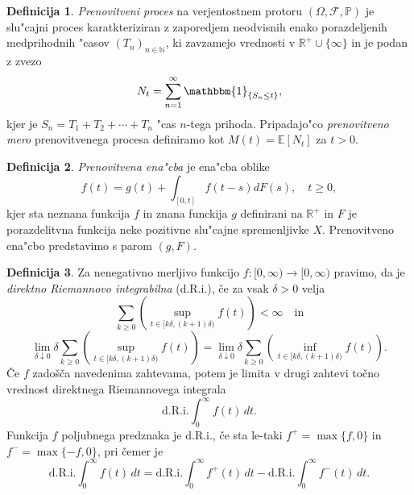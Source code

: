 \documentclass[12pt, a4paper, reqno]{amsart}
\theoremstyle{definition}
\newtheorem{definicija}{Definicija}[section]
\theoremstyle{plain}
\newcommand{\R}{\mathbb{R}}
\newcommand{\N}{\mathbb{N}}
\newcommand{\E}{\mathbb{E}}
\newcommand{\Prob}{\mathbb{P}}
\newcommand{\1}{\mathds{1}}
\begin{document}
    \begin{definicija}
        \textit{Prenovitveni proces} na verjentostnem protoru $(\Omega, \mathcal{F}, \Prob)$ je slu"cajni 
        proces
        karatkteriziran z zaporedjem neodvisnih enako porazdeljenih medprihodnih "casov $(T_n)_{n\in\N}$, 
        ki zavzamejo vrednosti v $\R^+\cup\{\infty\}$ in je podan z zvezo 
        \begin{equation*}
            N_t = \sum_{n=1}^{\infty}\mathbbm{1}_{\{S_n\leq t\}},
        \end{equation*}
        kjer je $S_n = T_1 + T_2 + \cdots + T_n$ "cas $n$-tega prihoda. Pripadajo"co 
        \textit{prenovitveno mero} prenovitvenega procesa definiramo kot $M(t) = \E\left[N_t\right]$ za 
        $t > 0$.
        \label{def:PrenovitveniProces}
    \end{definicija}

    \begin{definicija}
        \textit{Prenovitvena ena"cba} je ena"cba oblike 
        \begin{equation*}
            f(t) = g(t) + \int_{[0, t]}f(t - s)dF(s), \quad t\geq 0,
        \end{equation*}
        kjer sta neznana funkcija $f$ in znana funckija $g$ definirani na $\R^+$ in $F$ je 
        porazdelitvna funkcija neke pozitivne slu"cajne spremenljivke $X$. Prenovitveno ena"cbo predstavimo
        s parom $(g, F)$.
        \label{def:prenovitvenaEnacba}
    \end{definicija}

    \begin{definicija}
        Za nenegativno merljivo funkcijo \( f : [0, \infty) \to [0, \infty) \) pravimo, da je \textit{direktno 
        Riemannovo integrabilna} (d.R.i.), če za vsak $\delta > 0$ velja
        \begin{equation*}
            \sum_{k \geq 0} \left( \sup_{t \in [k\delta, (k+1)\delta)} f(t) \right) < \infty \quad \text{in}
        \end{equation*}
        \begin{equation*}
             \lim_{\delta \downarrow 0} \delta \sum_{k \geq 0} \left( \sup_{t \in [k\delta, (k+1)\delta)} f(t) \right) = \lim_{\delta \downarrow 0} \delta \sum_{k \geq 0} \left( \inf_{t \in [k\delta, (k+1)\delta)} f(t) \right).
        \end{equation*}
        Če \(f\) zadošča navedenima zahtevama, potem je limita v drugi zahtevi točno vrednost direktnega Riemannovega integrala
        \[
        \text{d.R.i.} \int_{0}^{\infty} f(t) \, dt.
        \]
        Funkcija \(f\) poljubnega predznaka je d.R.i., če sta le-taki \(f^+ = \max\{f, 0\}\) in \(f^- = \max\{-f, 0\}\), pri čemer je
        \[
        \text{d.R.i.} \int_{0}^{\infty} f(t) \, dt = \text{d.R.i.} \int_{0}^{\infty} f^+(t) \, dt - \text{d.R.i.} \int_{0}^{\infty} f^-(t) \, dt.
        \]
        \label{def:direktnaRieamnovaIntegrabilnost}
    \end{definicija}
\end{document}
